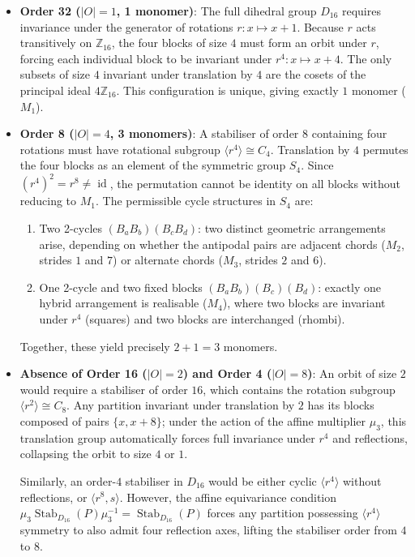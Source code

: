 \begin{itemize}
    \item \textbf{Order 32 ($|O| = 1$, 1 monomer)}:
    The full dihedral group $D_{16}$ requires invariance under the generator of rotations $r \colon x \mapsto x + 1$. Because $r$ acts transitively on $\mathbb{Z}_{16}$, the four blocks of size $4$ must form an orbit under $r$, forcing each individual block to be invariant under $r^4 \colon x \mapsto x + 4$. The only subsets of size $4$ invariant under translation by $4$ are the cosets of the principal ideal $4\mathbb{Z}_{16}$. This configuration is unique, giving exactly $1$ monomer ($M_1$).
    
    \item \textbf{Order 8 ($|O| = 4$, 3 monomers)}:
    A stabiliser of order $8$ containing four rotations must have rotational subgroup $\langle r^4 \rangle \cong C_4$. Translation by $4$ permutes the four blocks as an element of the symmetric group $S_4$. Since $(r^4)^2 = r^8 \neq \operatorname{id}$, the permutation cannot be identity on all blocks without reducing to $M_1$. The permissible cycle structures in $S_4$ are:
    \begin{enumerate}
        \item Two 2-cycles $(B_a B_b)(B_c B_d)$: two distinct geometric arrangements arise, depending on whether the antipodal pairs are adjacent chords ($M_2$, strides $1$ and $7$) or alternate chords ($M_3$, strides $2$ and $6$).
        \item One 2-cycle and two fixed blocks $(B_a B_b)(B_c)(B_d)$: exactly one hybrid arrangement is realisable ($M_4$), where two blocks are invariant under $r^4$ (squares) and two blocks are interchanged (rhombi).
    \end{enumerate}
    Together, these yield precisely $2 + 1 = 3$ monomers.
    
    \item \textbf{Absence of Order 16 ($|O| = 2$) and Order 4 ($|O| = 8$)}:
    An orbit of size $2$ would require a stabiliser of order $16$, which contains the rotation subgroup $\langle r^2 \rangle \cong C_8$. Any partition invariant under translation by $2$ has its blocks composed of pairs $\{x, x+8\}$; under the action of the affine multiplier $\mu_3$, this translation group automatically forces full invariance under $r^4$ and reflections, collapsing the orbit to size $4$ or $1$. 
    
    Similarly, an order-$4$ stabiliser in $D_{16}$ would be either cyclic $\langle r^4 \rangle$ without reflections, or $\langle r^8, s \rangle$. However, the affine equivariance condition $\mu_3 \operatorname{Stab}_{D_{16}}(P) \mu_3^{-1} = \operatorname{Stab}_{D_{16}}(P)$ forces any partition possessing $\langle r^4 \rangle$ symmetry to also admit four reflection axes, lifting the stabiliser order from $4$ to $8$.
    

\end{itemize}
